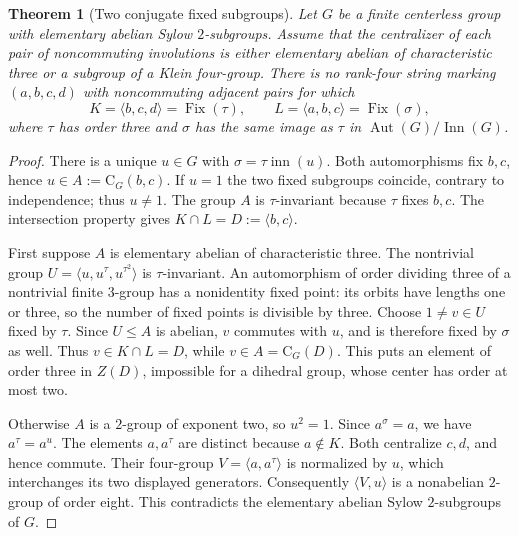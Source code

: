 \documentclass[11pt,a4paper]{article}
\newtheorem{theorem}[lemma]{Theorem}
\newcommand{\gen}[1]{\langle #1\rangle}
\newcommand{\Cent}{\mathrm C}
\newcommand{\Aut}{\operatorname{Aut}}
\begin{document}
\begin{theorem}[Two conjugate fixed subgroups]\label{fixed}
Let $G$ be a finite centerless group with elementary abelian Sylow
$2$-subgroups. Assume that the centralizer of each pair of noncommuting
involutions is either elementary abelian of characteristic three or
a subgroup of a Klein four-group. There is no rank-four string
marking $(a,b,c,d)$ with noncommuting adjacent pairs for which
\[
 K=\gen{b,c,d}=\operatorname{Fix}(\tau),\qquad
 L=\gen{a,b,c}=\operatorname{Fix}(\sigma),
\]
where $\tau$ has order three and $\sigma$ has the same image as $\tau$
in $\Aut(G)/\operatorname{Inn}(G)$.
\end{theorem}
\begin{proof}
There is a unique $u\in G$ with $\sigma=\tau\operatorname{inn}(u)$.
Both automorphisms fix $b,c$, hence $u\in A:=\Cent_G(b,c)$.
If $u=1$ the two fixed subgroups coincide, contrary to independence;
thus $u\ne1$. The group $A$ is $\tau$-invariant because $\tau$ fixes
$b,c$. The intersection property gives $K\cap L=D:=\gen{b,c}$.

First suppose $A$ is elementary abelian of characteristic three.
The nontrivial group $U=\gen{u,u^\tau,u^{\tau^2}}$ is $\tau$-invariant.
An automorphism of order dividing three of a nontrivial finite
$3$-group has a nonidentity fixed point: its orbits have lengths one
or three, so the number of fixed points is divisible by three.
Choose $1\ne v\in U$ fixed by $\tau$. Since $U\le A$ is abelian,
$v$ commutes with $u$, and is therefore fixed by $\sigma$ as well.
Thus $v\in K\cap L=D$, while $v\in A=\Cent_G(D)$. This puts an
element of order three in $Z(D)$, impossible for a dihedral group,
whose center has order at most two.

Otherwise $A$ is a $2$-group of exponent two, so $u^2=1$.
Since $a^\sigma=a$, we have $a^\tau=a^u$. The elements $a,a^\tau$
are distinct because $a\notin K$. Both centralize $c,d$, and hence
commute. Their four-group $V=\gen{a,a^\tau}$ is normalized by $u$,
which interchanges its two displayed generators. Consequently
$\gen{V,u}$ is a nonabelian $2$-group of order eight. This contradicts
the elementary abelian Sylow $2$-subgroups of $G$.
\end{proof}
\end{document}
